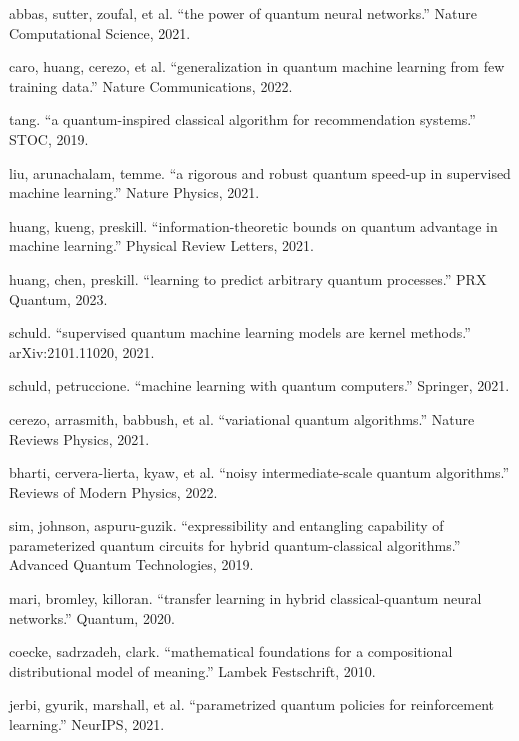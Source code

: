 \documentclass[11pt,a4paper]{article}
\theoremstyle{definition}
\theoremstyle{remark}
\begin{document}
\begin{enumerate}[label={[\arabic*]}]
    \item abbas, sutter, zoufal, et al. ``the power of quantum neural networks.'' Nature Computational Science, 2021.
    \item caro, huang, cerezo, et al. ``generalization in quantum machine learning from few training data.'' Nature Communications, 2022.
    \item tang. ``a quantum-inspired classical algorithm for recommendation systems.'' STOC, 2019.
    \item liu, arunachalam, temme. ``a rigorous and robust quantum speed-up in supervised machine learning.'' Nature Physics, 2021.
    \item huang, kueng, preskill. ``information-theoretic bounds on quantum advantage in machine learning.'' Physical Review Letters, 2021.
    \item huang, chen, preskill. ``learning to predict arbitrary quantum processes.'' PRX Quantum, 2023.
    \item schuld. ``supervised quantum machine learning models are kernel methods.'' arXiv:2101.11020, 2021.
    \item schuld, petruccione. ``machine learning with quantum computers.'' Springer, 2021.
    \item cerezo, arrasmith, babbush, et al. ``variational quantum algorithms.'' Nature Reviews Physics, 2021.
    \item bharti, cervera-lierta, kyaw, et al. ``noisy intermediate-scale quantum algorithms.'' Reviews of Modern Physics, 2022.
    \item sim, johnson, aspuru-guzik. ``expressibility and entangling capability of parameterized quantum circuits for hybrid quantum-classical algorithms.'' Advanced Quantum Technologies, 2019.
    \item mari, bromley, killoran. ``transfer learning in hybrid classical-quantum neural networks.'' Quantum, 2020.
    \item coecke, sadrzadeh, clark. ``mathematical foundations for a compositional distributional model of meaning.'' Lambek Festschrift, 2010.
    \item jerbi, gyurik, marshall, et al. ``parametrized quantum policies for reinforcement learning.'' NeurIPS, 2021.
\end{enumerate}
\end{document}

